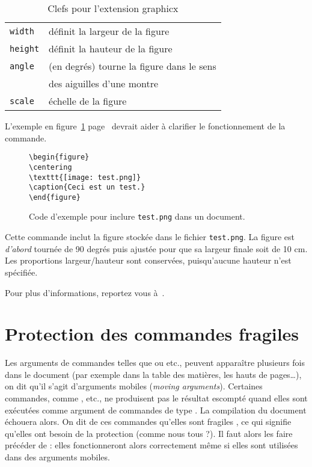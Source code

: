 \begin{table}[tb]
\caption{Clefs pour l'extension \textsf{graphicx}}
\label{keyvals}
\begin{lined}{9cm}
\begin{tabular}{@{}ll}
\texttt{width}& définit la largeur de la figure\\
\texttt{height}& définit la hauteur de la figure\\
\texttt{angle}& (en degrés) tourne la figure dans le sens \\
&  des aiguilles d'une montre \\
\texttt{scale}& échelle de la figure
\end{tabular}

\bigskip
\end{lined}
\end{table}

L'exemple en figure~\ref{figureex} page~\pageref{figureex} devrait
aider à clarifier le fonctionnement de la commande.
\begin{figure}
\begin{lined}{9cm}
\begin{verbatim}
\begin{figure}
\centering
\texttt{[image: test.png]}
\caption{Ceci est un test.}
\end{figure}
\end{verbatim}
\end{lined}
\caption{Code d'exemple pour inclure \texttt{test.png} dans un document.\label{figureex}}
\end{figure}

Cette commande inclut la figure stockée dans le fichier
\texttt{test.png}. La figure est \emph{d'abord} tournée de 90 degrés
puis ajustée pour que sa largeur finale soit de 10 cm. Les proportions
largeur/hauteur sont conservées, puisqu'aucune hauteur n'est spécifiée.

Pour plus d'informations, reportez vous à~\cite{graphics}.

\section{Protection des commandes \texorpdfstring{\og fragiles \fg}{\string«fragiles \string»}}

Les arguments de commandes telles que  ou 
etc., peuvent apparaître plusieurs fois dans le document (par exemple
dans la table des matières, les hauts de pages\dots), on dit qu'il
s'agit d'arguments \og mobiles \fg{} (\emph{moving arguments}).
Certaines commandes, comme ,  etc., ne
produisent pas le résultat escompté quand elles sont exécutées comme
argument de commandes de type . La compilation du document
échouera alors. On dit de ces commandes qu'elles sont \og fragiles
\fg, ce qui signifie qu'elles ont besoin de la protection (comme nous
tous ?). Il faut alors les faire précéder de  : elles
fonctionneront alors correctement même si elles sont utilisées dans
des arguments mobiles.

